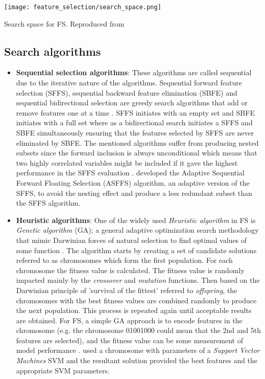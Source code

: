 \begin{marginfigure}
  \texttt{[image: feature\_selection/search\_space.png]}
  \caption{Search space for FS. Reproduced from \citet{liu2012feature}}
  \label{fig:fs_search_space}
\end{marginfigure}

\subsection{Search algorithms}\label{sec:fs_search_algo}
\begin{itemize}
  \item\textbf{Sequential selection algorithms}: These algorithms are called sequential due to the iterative nature of the algorithms. Sequential forward feature selection (SFFS), sequential backward feature elimination (SBFE) and sequential bidirectional selection are greedy search algorithms that add or remove features one at a time \citep{liu2005toward}. SFFS initiates with an empty set and SBFE initiates with a full set where as a bidirectional search initiates a SFFS and SBFE simultaneously ensuring that the features selected by SFFS are never eliminated by SBFE. The mentioned algorithms suffer from producing nested subsets since the forward inclusion is always unconditional which means that two highly correlated variables might be included if it gave the highest performance in the SFFS evaluation \citep{chandrashekar2014survey}. \citet{sun2006comparison} developed the Adaptive Sequential Forward Floating Selection (ASFFS) algorithm, an adaptive version of the SFFS, to avoid the nesting effect and produce a less redundant subset than the SFFS algorithm.
  \item\textbf{Heuristic algorithms}: One of the widely used \textit{Heuristic algorithm} in FS is \textit{Genetic algorithm} (GA); a general adaptive optimization search methodology that mimic Darwinian forces of natural selection to find optimal values of some function \citep{chandrashekar2014survey}. The algorithm starts by creating a set of candidate solutions referred to as chromosomes which form the first population. For each chromosome the fitness value is calculated. The fitness value is randomly impacted mainly by the \textit{crossover} and \textit{mutation} functions. Then based on the Darwinian principle of 'survival of the fittest' referred to \textit{offspring}, the chromosomes with the best fitness values are combined randomly to produce the next population. This process is repeated again until acceptable results are obtained. For FS, a simple GA approach is to encode features in the chromosome (e.g. the chromosome 01001000 could mean that the 2nd and 5th features are selected), and the fitness value can be some measurement of model performance \citep{de2015grammar}. \citet{huang2006ga} used a chromosome with parameters of a \textit{Support Vector Machines} SVM and the resultant solution provided the best features and the appropriate SVM parameters.
\end{itemize}

